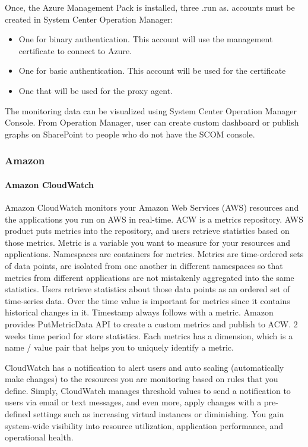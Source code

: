 \documentclass{sig-alternate-05-2015}
\begin{document}
Once, the Azure Management Pack is installed, three .run as. accounts must be created in System Center Operation Manager:

\begin{itemize}
 \item One for binary authentication. This account will use the management certificate to connect to Azure.
 \item One for basic authentication. This account will be used for the certificate
 \item One that will be used for the proxy agent.
\end{itemize}
 
The monitoring data can be visualized using System Center Operation Manager Console. From Operation Manager, user can create custom dashboard or publish graphs on SharePoint to people who do not have the SCOM console.

\subsubsection{Amazon}

\paragraph{Amazon CloudWatch}

Amazon CloudWatch monitors your Amazon Web Services (AWS) resources and the applications you run on AWS in real-time. ACW is a metrics repository. AWS product puts metrics into the repository, and users retrieve statistics based on those metrics. Metric is a variable you want to measure for your resources and applications. Namespaces are containers for metrics. Metrics are time-ordered sets of data points, are isolated from one another in different namespaces so that metrics from different applications are not mistakenly aggregated into the same statistics. Users retrieve statistics about those data points as an ordered set of time-series data. Over the time value is important for metrics since it contains historical changes in it. Timestamp always follows with a metric. Amazon provides PutMetricData API to create a custom metrics and publish to ACW. 2 weeks time period for store statistics. Each metrics has a dimension, which is a name / value pair that helps you to uniquely identify a metric.

CloudWatch has a notification to alert users and auto scaling (automatically make changes) to the resources you are monitoring based on rules that you define. Simply, CloudWatch manages threshold values to send a notification to users via email or text messages, and even more, apply changes with a pre-defined settings such as increasing virtual instances or diminishing. You gain system-wide visibility into resource utilization, application performance, and operational health.
\end{document}
